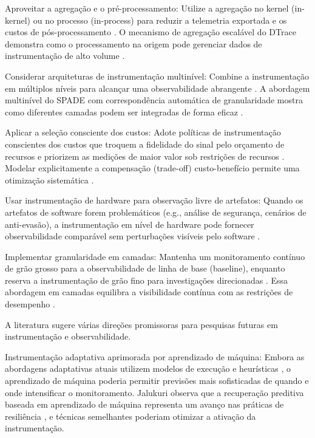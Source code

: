 \documentclass[sigconf, anonymous]{acmart}
\begin{document}
Aproveitar a agregação e o pré-processamento: Utilize a agregação no kernel (in-kernel) ou no processo (in-process) para reduzir a telemetria exportada e os custos de pós-processamento \cite{cantrill_2004}. O mecanismo de agregação escalável do DTrace demonstra como o processamento na origem pode gerenciar dados de instrumentação de alto volume \cite{cantrill_2004}.

Considerar arquiteturas de instrumentação multinível: Combine a instrumentação em múltiplos níveis para alcançar uma observabilidade abrangente \cite{ghanta_2017, brown_2003}. A abordagem multinível do SPADE com correspondência automática de granularidade mostra como diferentes camadas podem ser integradas de forma eficaz \cite{brown_2003}.

Aplicar a seleção consciente dos custos: Adote políticas de instrumentação conscientes dos custos que troquem a fidelidade do sinal pelo orçamento de recursos e priorizem as medições de maior valor sob restrições de recursos \cite{haghshenas_2023}. Modelar explicitamente a compensação (trade-off) custo-benefício permite uma otimização sistemática \cite{haghshenas_2023}.

Usar instrumentação de hardware para observação livre de artefatos: Quando os artefatos de software forem problemáticos (e.g., análise de segurança, cenários de anti-evasão), a instrumentação em nível de hardware pode fornecer observabilidade comparável sem perturbações visíveis pelo software \cite{spensky_2016}.

Implementar granularidade em camadas: Mantenha um monitoramento contínuo de grão grosso para a observabilidade de linha de base (baseline), enquanto reserva a instrumentação de grão fino para investigações direcionadas \cite{ramesh_2025, haghshenas_2023}. Essa abordagem em camadas equilibra a visibilidade contínua com as restrições de desempenho \cite{ramesh_2025}.

A literatura sugere várias direções promissoras para pesquisas futuras em instrumentação e observabilidade.

Instrumentação adaptativa aprimorada por aprendizado de máquina: Embora as abordagens adaptativas atuais utilizem modelos de execução e heurísticas \cite{mos_2004}, o aprendizado de máquina poderia permitir previsões mais sofisticadas de quando e onde intensificar o monitoramento. Jalukuri observa que a recuperação preditiva baseada em aprendizado de máquina representa um avanço nas práticas de resiliência \cite{jalukuri_2025}, e técnicas semelhantes poderiam otimizar a ativação da instrumentação.
\end{document}
